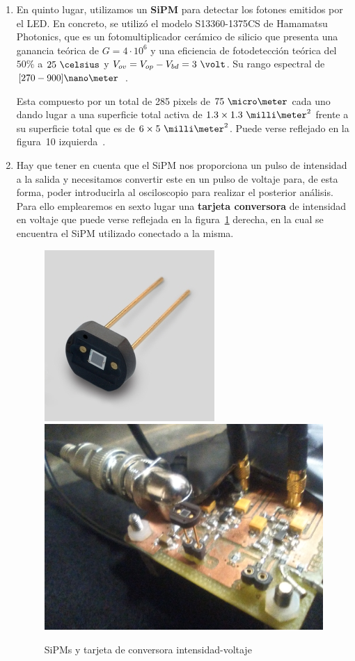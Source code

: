 \begin{enumerate}
\item {} En quinto lugar, utilizamos un \textbf{SiPM} para detectar los fotones emitidos por el LED. En concreto, se utilizó el modelo S13360-1375CS de Hamamatsu Photonics, que es un fotomultiplicador cerámico de silicio que presenta una ganancia teórica de $G=4 \cdotp 10^6$ y una eficiencia de fotodetección teórica del $50\%$ a $25~\celsius$ y $V_{ov}=V_{op}-V_{bd}=3~\volt$. Su rango espectral de $[270-900]\nano\meter$~\cite{datasheet SiPM}.

Esta compuesto por un total de 285 pixels de $75~\micro\meter$ cada uno dando lugar a una superficie total activa de $1.3\times1.3~\milli\meter^2$ frente a su superficie total que es de $6\times5~\milli\meter^2$. Puede verse reflejado en la figura~10 izquierda~\cite{datasheet SiPM}. 

\item {} Hay que tener en cuenta que el SiPM nos proporciona un pulso de intensidad a la salida y  necesitamos convertir este en un pulso de voltaje para, de esta forma, poder introducirla al osciloscopio para realizar el posterior análisis. Para ello emplearemos en sexto lugar una \textbf{tarjeta conversora} de intensidad en voltaje que puede verse reflejada en la figura~\ref{TarjetaSiPM} derecha, en la cual se encuentra el SiPM utilizado conectado a la misma. 

\begin{figure}[htb]
\centering
{
\includegraphics[scale=0.55]{SiPM.png} 
}
{
\includegraphics[scale=0.25]{tarjeta.png} 
}
\caption{SiPMs y tarjeta de conversora intensidad-voltaje\label{TarjetaSiPM}}
\end{figure}


\end{enumerate}
